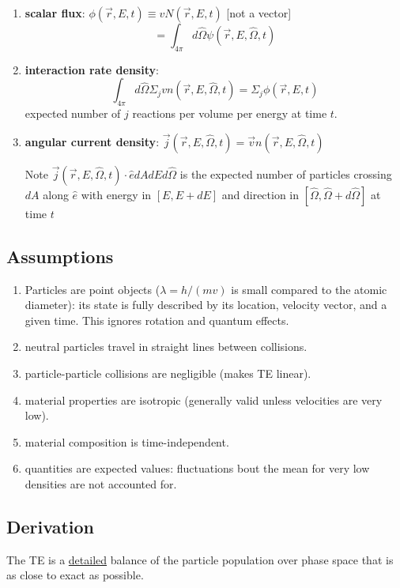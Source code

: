\documentclass[12pt]{article}
\newcommand{\vOmega}{\ensuremath{\hat{\Omega}}}
\begin{document}
\begin{enumerate}
\item \textbf{scalar flux}: $\phi(\vec{r},E,t) \equiv v N(\vec{r},E,t)$ [not a vector]
\[= \int_{4\pi} d\vOmega \psi(\vec{r}, E, \vOmega, t) \]

\item \textbf{interaction rate density}:
\[\int_{4\pi} d\vOmega \Sigma_j v n(\vec{r}, E, \vOmega, t) = \Sigma_j \phi(\vec{r},E,t)\]
expected number of $j$ reactions per volume per energy at time $t$.

\item \textbf{angular current density}: $\vec{j}(\vec{r}, E, \vOmega, t) = \vec{v} n(\vec{r}, E, \vOmega, t)$ 

Note $\vec{j}(\vec{r}, E, \vOmega, t) \cdot \hat{e} dA dE d\vOmega$ is the expected number of particles crossing $dA$ along $\hat{e}$ with energy in $[E, E + dE]$ and direction in $[\vOmega, \vOmega + d\vOmega]$ at time $t$
\end{enumerate}

\subsection{Assumptions}
\begin{enumerate}
\item Particles are point objects ($\lambda = h/(mv)$ is small compared to the atomic diameter): its state is fully described by its location, velocity vector, and a given time. This ignores rotation and quantum effects.

\item neutral particles travel in straight lines between collisions.

\item particle-particle collisions are negligible (makes TE linear).

\item material properties are isotropic (generally valid unless velocities are very low).

\item material composition is time-independent.

\item quantities are expected values: fluctuations bout the mean for very low densities are not accounted for.
\end{enumerate}


\subsection{Derivation}
The TE is a \underline{detailed} balance of the particle population over phase space that is as close to exact as possible. 
\end{document}
